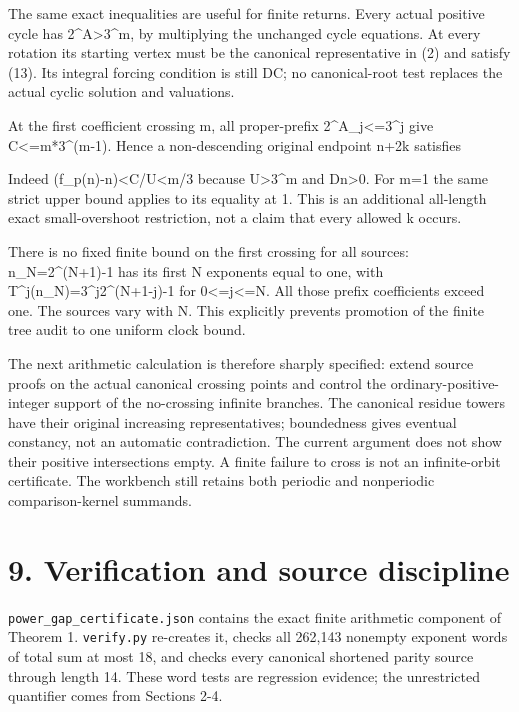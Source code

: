 The same exact inequalities are useful for finite returns. Every actual
positive cycle has 2\^{}A\textgreater3\^{}m, by multiplying the
unchanged cycle equations. At every rotation its starting vertex must be
the canonical representative in (2) and satisfy (13). Its integral
forcing condition is still D\textbar C; no canonical-root test replaces
the actual cyclic solution and valuations.

At the first coefficient crossing m, all proper-prefix
2\^{}A\_j\textless=3\^{}j give C\textless=m*3\^{}(m-1). Hence a
non-descending original endpoint n+2k satisfies


Indeed (f\_p(n)-n)\textless C/U\textless m/3 because U\textgreater3\^{}m
and Dn\textgreater0. For m=1 the same strict upper bound applies to its
equality at 1. This is an additional all-length exact small-overshoot
restriction, not a claim that every allowed k occurs.

There is no fixed finite bound on the first crossing for all sources:
n\_N=2\^{}(N+1)-1 has its first N exponents equal to one, with
T\^{}j(n\_N)=3\^{}j2\^{}(N+1-j)-1 for 0\textless=j\textless=N. All those
prefix coefficients exceed one. The sources vary with N. This explicitly
prevents promotion of the finite tree audit to one uniform clock bound.

The next arithmetic calculation is therefore sharply specified: extend
source proofs on the actual canonical crossing points and control the
ordinary-positive-integer support of the no-crossing infinite branches.
The canonical residue towers have their original increasing
representatives; boundedness gives eventual constancy, not an automatic
contradiction. The current argument does not show their positive
intersections empty. A finite failure to cross is not an infinite-orbit
certificate. The workbench still retains both periodic and nonperiodic
comparison-kernel summands.

\section{9. Verification and source discipline}

\nolinkurl{power_gap_certificate.json} contains the exact finite
arithmetic component of Theorem 1. \nolinkurl{verify.py} re-creates it,
checks all 262,143 nonempty exponent words of total sum at most 18, and
checks every canonical shortened parity source through length 14. These
word tests are regression evidence; the unrestricted quantifier comes
from Sections 2-4.

